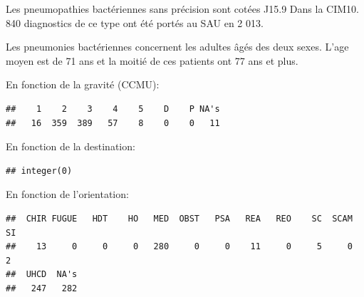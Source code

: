 \documentclass[12pt,english,french,twoside]{book}\usepackage[]{graphicx}\usepackage[]{color}
\makeatletter
\newenvironment{kframe}{%
 \def\at@end@of@kframe{}%
 \ifinner\ifhmode%
  \def\at@end@of@kframe{\end{minipage}}%
  \begin{minipage}{\columnwidth}%
 \fi\fi%
 \def\FrameCommand##1{\hskip\@totalleftmargin \hskip-\fboxsep
 \colorbox{shadecolor}{##1}\hskip-\fboxsep
     \hskip-\linewidth \hskip-\@totalleftmargin \hskip\columnwidth}%
 \MakeFramed {\advance\hsize-\width
   \@totalleftmargin\z@ \linewidth\hsize
   \@setminipage}}%
 {\par\unskip\endMakeFramed%
 \at@end@of@kframe}
\newenvironment{knitrout}{}{} %
\makeatother
\begin{document}
Les pneumopathies bactériennes sans précision sont cotées J15.9 Dans la CIM10.
840 diagnostics de ce type ont été portés au SAU en 2 013.

Les pneumonies bactériennes concernent les adultes âgés des deux sexes. L'age moyen est de 71 ans et la moitié de ces patients ont 77 ans et plus.

\begin{knitrout}
\color{fgcolor}\begin{kframe}


{\ttfamily\noindent\bfseries{}}

{\ttfamily\noindent\color{warningcolor}{\#\# Warning: there is no package called 'epitools'}}

{\ttfamily\noindent\bfseries\color{errorcolor}{\#\# Error: Il manque le package 'epitools'}}\end{kframe}
\end{knitrout}


En fonction de la gravité (CCMU):
\begin{knitrout}
\color{fgcolor}\begin{kframe}
\begin{verbatim}
##    1    2    3    4    5    D    P NA's 
##   16  359  389   57    8    0    0   11
\end{verbatim}
\end{kframe}
\end{knitrout}


En fonction de la destination:
\begin{knitrout}
\color{fgcolor}\begin{kframe}
\begin{verbatim}
## integer(0)
\end{verbatim}
\end{kframe}
\end{knitrout}


En fonction de l'orientation:
\begin{knitrout}
\color{fgcolor}\begin{kframe}
\begin{verbatim}
##  CHIR FUGUE   HDT    HO   MED  OBST   PSA   REA   REO    SC  SCAM    SI 
##    13     0     0     0   280     0     0    11     0     5     0     2 
##  UHCD  NA's 
##   247   282
\end{verbatim}
\end{kframe}
\end{knitrout}
\end{document}
